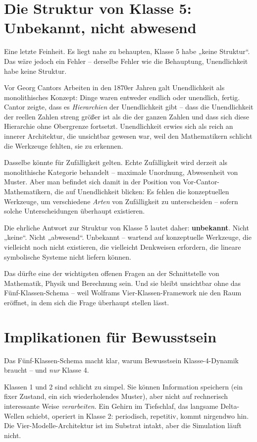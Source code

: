 \documentclass[11pt, twoside, openright]{book}
\begin{document}
\section*{Die Struktur von Klasse 5: Unbekannt, nicht abwesend}

Eine letzte Feinheit. Es liegt nahe zu behaupten, Klasse 5 habe „keine Struktur“. Das wäre jedoch ein Fehler -- derselbe Fehler wie die Behauptung, Unendlichkeit habe keine Struktur.

Vor Georg Cantors Arbeiten in den 1870er Jahren galt Unendlichkeit als monolithisches Konzept: Dinge waren entweder endlich oder unendlich, fertig. Cantor zeigte, dass es \textit{Hierarchien} der Unendlichkeit gibt -- dass die Unendlichkeit der reellen Zahlen streng größer ist als die der ganzen Zahlen und dass sich diese Hierarchie ohne Obergrenze fortsetzt. Unendlichkeit erwies sich als reich an innerer Architektur, die unsichtbar gewesen war, weil den Mathematikern schlicht die Werkzeuge fehlten, sie zu erkennen.

Dasselbe könnte für Zufälligkeit gelten. Echte Zufälligkeit wird derzeit als monolithische Kategorie behandelt -- maximale Unordnung, Abwesenheit von Muster. Aber man befindet sich damit in der Position von Vor-Cantor-Mathematikern, die auf Unendlichkeit blicken: Es fehlen die konzeptuellen Werkzeuge, um verschiedene \textit{Arten} von Zufälligkeit zu unterscheiden -- sofern solche Unterscheidungen überhaupt existieren.

Die ehrliche Antwort zur Struktur von Klasse 5 lautet daher: \textbf{unbekannt}. Nicht „keine“. Nicht „abwesend“. Unbekannt -- wartend auf konzeptuelle Werkzeuge, die vielleicht noch nicht existieren, die vielleicht Denkweisen erfordern, die lineare symbolische Systeme nicht liefern können.

Das dürfte eine der wichtigsten offenen Fragen an der Schnittstelle von Mathematik, Physik und Berechnung sein. Und sie bleibt unsichtbar ohne das Fünf-Klassen-Schema -- weil Wolframs Vier-Klassen-Framework nie den Raum eröffnet, in dem sich die Frage überhaupt stellen lässt.

\section*{Implikationen für Bewusstsein}

Das Fünf-Klassen-Schema macht klar, warum Bewusstsein Klasse-4-Dynamik braucht -- und \textit{nur} Klasse 4.

Klassen 1 und 2 sind schlicht zu simpel. Sie können Information speichern (ein fixer Zustand, ein sich wiederholendes Muster), aber nicht auf rechnerisch interessante Weise \textit{verarbeiten}. Ein Gehirn im Tiefschlaf, das langsame Delta-Wellen schiebt, operiert in Klasse 2: periodisch, repetitiv, kommt nirgendwo hin. Die Vier-Modelle-Architektur ist im Substrat intakt, aber die Simulation läuft nicht.
\end{document}

